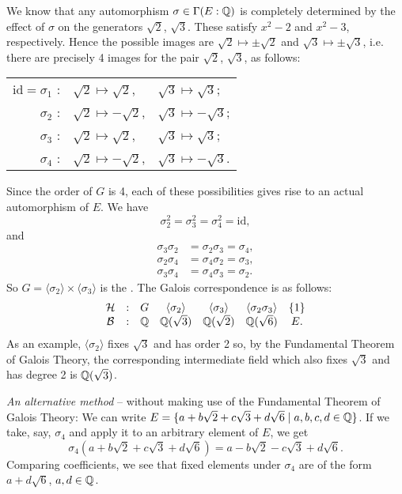 \begin{example}
	We know that any automorphism $\sigma \in \Gamma(E : \mathbb{Q})$ is completely determined by the effect of $\sigma$ on the generators $\sqrt{2}$, $\sqrt{3}$. These satisfy $x^2 - 2$ and $x^2 - 3$, respectively. Hence the possible images are $\sqrt{2} \mapsto \pm\sqrt{2}$ and $\sqrt{3} \mapsto \pm\sqrt{3}$, i.e. there are precisely 4 images for the pair $\sqrt{2}$, $\sqrt{3}$, as follows:
	\begin{center}
		\begin{tabular}{r l l}
		$\text{id} =\sigma_1$ : & $\sqrt{2} \mapsto \sqrt{2}$, & $\sqrt{3} \mapsto \sqrt{3}$; \\
		$\sigma_2$ : & $\sqrt{2} \mapsto -\sqrt{2}$, & $\sqrt{3} \mapsto -\sqrt{3}$; \\
		$\sigma_3$ : & $\sqrt{2} \mapsto \sqrt{2}$, & $\sqrt{3} \mapsto \sqrt{3}$; \\
		$\sigma_4$ : & $\sqrt{2} \mapsto -\sqrt{2}$, & $\sqrt{3} \mapsto -\sqrt{3}$.
		\end{tabular}
	\end{center}
	Since the order of $G$ is 4, each of these possibilities gives rise to an actual automorphism of $E$. We have
	\[
		\sigma_2^2 = \sigma_3^2 = \sigma_4^2 = \text{id},
	\]
	and
	\begin{align*}
		\sigma_3 \sigma_2 &= \sigma_2 \sigma_3 = \sigma_4, \\
		\sigma_2 \sigma_4 &= \sigma_4 \sigma_2 = \sigma_3, \\
		\sigma_3 \sigma_4 &= \sigma_4 \sigma_3 = \sigma_2.
	\end{align*}
	So $G = \langle \sigma_2 \rangle \times \langle \sigma_3 \rangle$ is the . The Galois correspondence is as follows:
	\[
		\begin{matrix}
			\mathcal{H} & : & G & \langle \sigma_2 \rangle & \langle \sigma_3 \rangle & \langle \sigma_2 \sigma_3 \rangle & \{1\} \\
			\mathcal{B} & : & \mathbb{Q} & \mathbb{Q}(\sqrt{3}) & \mathbb{Q}(\sqrt{2}) & \mathbb{Q}(\sqrt{6}) & E.
		\end{matrix}
	\]
	As an example, $\langle \sigma_2 \rangle$ fixes $\sqrt{3}$ and has order 2 so, by the Fundamental Theorem of Galois Theory, the corresponding intermediate field which also fixes $\sqrt{3}$ and has degree 2 is $\mathbb{Q}(\sqrt{3})$.
	
	\emph{An alternative method} -- without making use of the Fundamental Theorem of Galois Theory: We can write $E = \{a + b\sqrt{2} + c\sqrt{3} + d\sqrt{6} \mid a, b, c, d \in \mathbb{Q}\}$. If we take, say, $\sigma_4$ and apply it to an arbitrary element of $E$, we get
	\[
		\sigma_4(a + b\sqrt{2} + c\sqrt{3} + d\sqrt{6}) = a - b\sqrt{2} - c\sqrt{3} + d\sqrt{6}.
	\]
	Comparing coefficients, we see that fixed elements under $\sigma_4$ are of the form $a + d\sqrt{6}$, $a, d \in \mathbb{Q}$.
\end{example}

